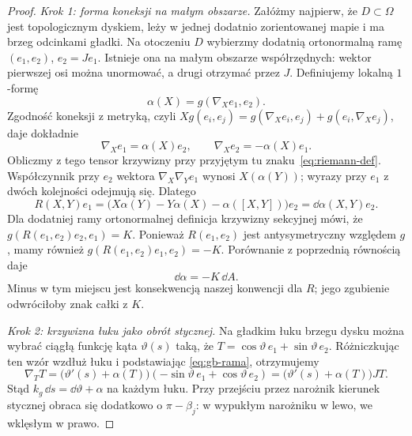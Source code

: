 \begin{proof}
\emph{Krok 1: forma koneksji na małym obszarze.}
Załóżmy najpierw, że $D\subset\Omega$ jest topologicznym
dyskiem, leży w jednej dodatnio zorientowanej mapie i ma
brzeg odcinkami gładki. Na otoczeniu $D$ wybierzmy
dodatnią ortonormalną ramę $(e_1,e_2)$, $e_2=Je_1$.
Istnieje ona na małym obszarze współrzędnych: wektor
pierwszej osi można unormować, a drugi otrzymać przez $J$.
Definiujemy lokalną $1$-formę
\[
 \alpha(X)=g(\nabla_Xe_1,e_2).
\]
Zgodność koneksji z metryką, czyli
$Xg(e_i,e_j)=g(\nabla_Xe_i,e_j)+g(e_i,\nabla_Xe_j)$,
daje dokładnie
\begin{equation}\label{eq:gb-rama}
 \nabla_Xe_1=\alpha(X)e_2,
 \qquad \nabla_Xe_2=-\alpha(X)e_1.
\end{equation}
Obliczmy z tego tensor krzywizny przy przyjętym tu
znaku~\eqref{eq:riemann-def}. Współczynnik przy $e_2$
wektora $\nabla_X\nabla_Ye_1$ wynosi $X(\alpha(Y))$;
wyrazy przy $e_1$ z dwóch kolejności odejmują się.
Dlatego
\[
 R(X,Y)e_1
 =\bigl(X\alpha(Y)-Y\alpha(X)-\alpha([X,Y])\bigr)e_2
 =\dd\alpha(X,Y)e_2.
\]
Dla dodatniej ramy ortonormalnej definicja krzywizny
sekcyjnej mówi, że
$g(R(e_1,e_2)e_2,e_1)=K$. Ponieważ $R(e_1,e_2)$
jest antysymetryczny względem $g$, mamy również
$g(R(e_1,e_2)e_1,e_2)=-K$. Porównanie z poprzednią
równością daje
\begin{equation}\label{eq:gb-dalpha}
 \dd\alpha=-K\,\dd A.
\end{equation}
Minus w tym miejscu jest konsekwencją naszej konwencji
dla $R$; jego zgubienie odwróciłoby znak całki z $K$.

\emph{Krok 2: krzywizna łuku jako obrót stycznej.}
Na gładkim łuku brzegu dysku można wybrać ciągłą
funkcję kąta $\vartheta(s)$ taką, że
$T=\cos\vartheta\,e_1+\sin\vartheta\,e_2$.
Różniczkując ten wzór wzdłuż łuku i podstawiając
\eqref{eq:gb-rama}, otrzymujemy
\[
 \nabla_TT
 =\bigl(\vartheta'(s)+\alpha(T)\bigr)
             (-\sin\vartheta\,e_1+\cos\vartheta\,e_2)
 =\bigl(\vartheta'(s)+\alpha(T)\bigr)JT.
\]
Stąd $k_g\,\dd s=\dd\vartheta+\alpha$ na każdym łuku.
Przy przejściu przez narożnik kierunek stycznej
obraca się dodatkowo o $\pi-\beta_j$: w wypukłym
narożniku w lewo, we wklęsłym w prawo.


\end{proof}
